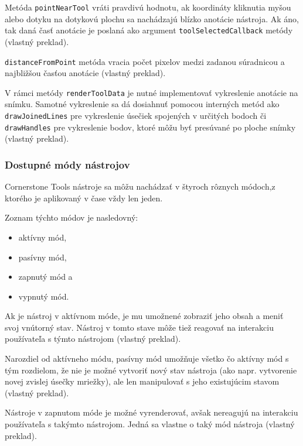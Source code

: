 Metóda \texttt{pointNearTool} vráti pravdivú hodnotu, ak koordináty kliknutia myšou alebo dotyku na dotykovú plochu sa nachádzajú blízko anotácie nástroja. Ak áno, tak daná časť anotácie je poslaná ako argument \texttt{toolSelectedCallback} metódy \cite{base_tool_description} (vlastný preklad).

\texttt{distanceFromPoint} metóda vracia počet pixelov medzi zadanou súradnicou a najbližšou časťou anotácie \cite{base_tool_description} (vlastný preklad).

V rámci metódy \texttt{renderToolData} je nutné implementovať vykreslenie anotácie na snímku. Samotné vykreslenie sa dá dosiahnuť pomocou interných metód ako \texttt{drawJoinedLines} pre vykreslenie úsečiek spojených v určitých bodoch či \texttt{drawHandles} pre vykreslenie bodov, ktoré môžu byť presúvané po ploche snímky \cite{base_tool_description} (vlastný preklad).

\subsubsection {Dostupné módy nástrojov}
Cornerstone Tools nástroje sa môžu nachádzať v štyroch rôznych módoch,\newline z ktorého je aplikovaný v čase vždy len jeden.

\clearpage

Zoznam týchto módov je nasledovný:
\begin {itemize}
\item {aktívny mód,}
\item {pasívny mód,}
\item {zapnutý mód a}
\item {vypnutý mód.}
\end {itemize}

Ak je nástroj v aktívnom móde, je mu umožnené zobraziť jeho obsah a meniť svoj vnútorný stav. Nástroj v tomto stave môže tiež reagovať na interakciu používateľa s týmto nástrojom \cite{cornerstone_tools_modes} (vlastný preklad).

Narozdiel od aktívneho módu, pasívny mód umožňuje všetko čo aktívny mód s tým rozdielom, že nie je možné vytvoriť nový stav nástroja (ako napr. vytvorenie novej zvislej úsečky mriežky), ale len manipulovať s jeho existujúcim stavom \cite{cornerstone_tools_modes} (vlastný preklad).

Nástroje v zapnutom móde je možné vyrenderovať, avšak nereagujú na interakciu používateľa s takýmto nástrojom. Jedná sa vlastne o taký  mód nástroja \cite{cornerstone_tools_modes} (vlastný preklad).

